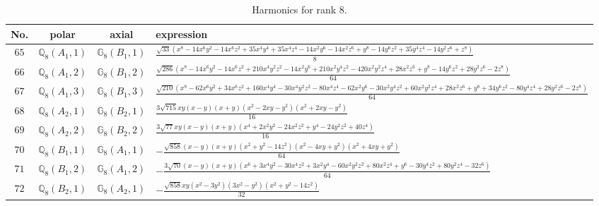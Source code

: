 \documentclass[fleqn,8pt,landscape]{jsarticle}
\begin{document}
\begin{table}[ht!]
\begin{center}
\caption{Harmonics for rank 8.}
\renewcommand{\arraystretch}{1.3}
\begin{tabular}{cccl} \hline \hline
No. & polar & axial & expression \\ \hline
$ 65 $ & $ \mathbb{Q}_{8}(A_{1},1) $ & $ \mathbb{G}_{8}(B_{1},1) $ & $ \frac{\sqrt{33} \left(x^{8} - 14 x^{6} y^{2} - 14 x^{6} z^{2} + 35 x^{4} y^{4} + 35 x^{4} z^{4} - 14 x^{2} y^{6} - 14 x^{2} z^{6} + y^{8} - 14 y^{6} z^{2} + 35 y^{4} z^{4} - 14 y^{2} z^{6} + z^{8}\right)}{8} $ \\
$ 66 $ & $ \mathbb{Q}_{8}(A_{1},2) $ & $ \mathbb{G}_{8}(B_{1},2) $ & $ \frac{\sqrt{286} \left(x^{8} - 14 x^{6} y^{2} - 14 x^{6} z^{2} + 210 x^{4} y^{2} z^{2} - 14 x^{2} y^{6} + 210 x^{2} y^{4} z^{2} - 420 x^{2} y^{2} z^{4} + 28 x^{2} z^{6} + y^{8} - 14 y^{6} z^{2} + 28 y^{2} z^{6} - 2 z^{8}\right)}{64} $ \\
$ 67 $ & $ \mathbb{Q}_{8}(A_{1},3) $ & $ \mathbb{G}_{8}(B_{1},3) $ & $ \frac{\sqrt{210} \left(x^{8} - 62 x^{6} y^{2} + 34 x^{6} z^{2} + 160 x^{4} y^{4} - 30 x^{4} y^{2} z^{2} - 80 x^{4} z^{4} - 62 x^{2} y^{6} - 30 x^{2} y^{4} z^{2} + 60 x^{2} y^{2} z^{4} + 28 x^{2} z^{6} + y^{8} + 34 y^{6} z^{2} - 80 y^{4} z^{4} + 28 y^{2} z^{6} - 2 z^{8}\right)}{64} $ \\
$ 68 $ & $ \mathbb{Q}_{8}(A_{2},1) $ & $ \mathbb{G}_{8}(B_{2},1) $ & $ \frac{3 \sqrt{715} x y \left(x - y\right) \left(x + y\right) \left(x^{2} - 2 x y - y^{2}\right) \left(x^{2} + 2 x y - y^{2}\right)}{16} $ \\
$ 69 $ & $ \mathbb{Q}_{8}(A_{2},2) $ & $ \mathbb{G}_{8}(B_{2},2) $ & $ \frac{3 \sqrt{77} x y \left(x - y\right) \left(x + y\right) \left(x^{4} + 2 x^{2} y^{2} - 24 x^{2} z^{2} + y^{4} - 24 y^{2} z^{2} + 40 z^{4}\right)}{16} $ \\
$ 70 $ & $ \mathbb{Q}_{8}(B_{1},1) $ & $ \mathbb{G}_{8}(A_{1},1) $ & $ - \frac{\sqrt{858} \left(x - y\right) \left(x + y\right) \left(x^{2} + y^{2} - 14 z^{2}\right) \left(x^{2} - 4 x y + y^{2}\right) \left(x^{2} + 4 x y + y^{2}\right)}{64} $ \\
$ 71 $ & $ \mathbb{Q}_{8}(B_{1},2) $ & $ \mathbb{G}_{8}(A_{1},2) $ & $ - \frac{3 \sqrt{70} \left(x - y\right) \left(x + y\right) \left(x^{6} + 3 x^{4} y^{2} - 30 x^{4} z^{2} + 3 x^{2} y^{4} - 60 x^{2} y^{2} z^{2} + 80 x^{2} z^{4} + y^{6} - 30 y^{4} z^{2} + 80 y^{2} z^{4} - 32 z^{6}\right)}{64} $ \\
$ 72 $ & $ \mathbb{Q}_{8}(B_{2},1) $ & $ \mathbb{G}_{8}(A_{2},1) $ & $ - \frac{\sqrt{858} x y \left(x^{2} - 3 y^{2}\right) \left(3 x^{2} - y^{2}\right) \left(x^{2} + y^{2} - 14 z^{2}\right)}{32} $ \\

\end{tabular}
\end{center}
\end{table}
\end{document}
